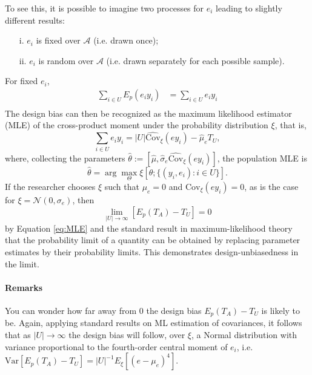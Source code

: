 \documentclass{article}
\begin{document}
To see this, it is possible to imagine two processes for $e_i$ leading to slightly different results:
\begin{itemize}
	\item[i.] $e_i$ is fixed over $\mathcal{A}$ (i.e. drawn once);
	\item[ii.] $e_i$ is random over $\mathcal{A}$ (i.e. drawn separately for each possible sample).
\end{itemize}
For fixed $e_i$, 
\begin{equation}\begin{split}
\sum_{i \in U} E_p \left(e_i y_i\right)&=\sum_{i \in U} e_i y_i\\
\end{split}\end{equation}
The design bias can then be recognized as the maximum likelihood estimator (MLE) of the cross-product moment under the probability distribution $\xi$, that is,
\begin{equation}
\sum_{i \in U} e_i y_i = |U| \hat{\text{Cov}}_\xi(e y_i) - \hat{\mu}_e T_U,
\label{eq:MLE}
\end{equation} where, collecting the parameters $\hat{\theta}:= [\hat{\mu}, \hat{\sigma}_e \hat{\text{Cov}}_\xi(e y_i)]$, the population MLE is
\begin{equation}
\hat{\theta} = \arg\max_{\Theta} \xi\left[\theta; \{(y_i, e_i) : i \in U\}\right].
\end{equation}
If the researcher chooses $\xi$ such that $\mu_e = 0$ and $\text{Cov}_\xi(e y_i) = 0$, as is the case for $\xi = \mathcal{N}(0, \sigma_e)$, then 
\begin{equation}
	\lim_{|U| \rightarrow \infty} [ E_p(T_A) - T_U ] = 0
\end{equation}
by Equation \ref{eq:MLE} and the standard result in maximum-likelihood theory that the probability limit of a quantity can be obtained by replacing parameter estimates by their probability limits. This demonstrates design-unbiasedness in the limit.

\paragraph{Remarks}

You can wonder how far away from 0 the design bias $E_p(T_A) - T_U$ is likely to be.
Again, applying standard results on ML estimation of covariances, it follows that as $|U|\rightarrow \infty$ the design bias will follow, over $\xi$, a Normal distribution with variance proportional to the fourth-order central moment of $e_i$, i.e. $\text{Var}[E_p(T_A) - T_U] = |U|^{-1} E_\xi[(e - \mu_e)^4]$. 
\end{document}
